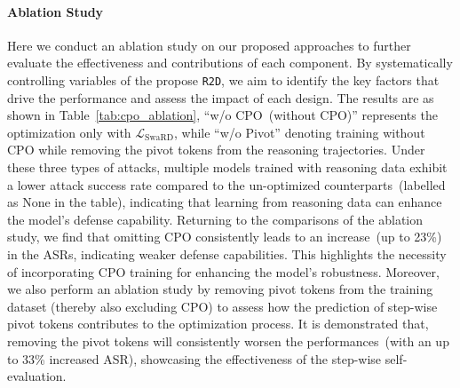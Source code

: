 \paragraph{Ablation Study} Here we conduct an ablation study on our proposed approaches to further evaluate the effectiveness and contributions of each component. By systematically controlling variables of the propose \texttt{R2D}, we aim to identify the key factors that drive the performance and assess the impact of each design. The results are as shown in Table~\ref{tab:cpo_ablation}, ``w/o CPO~(without CPO)'' represents the optimization only with $\mathcal{L}_\text{SwaRD}$, while ``w/o Pivot'' denoting training without CPO while removing the pivot tokens from the reasoning trajectories. Under these three types of attacks, multiple models trained with reasoning data exhibit a lower attack success rate compared to the un-optimized counterparts~(labelled as None in the table), indicating that learning from reasoning data can enhance the model's defense capability. Returning to the comparisons of the ablation study, we find that omitting CPO consistently leads to an increase~(up to 23\%) in the ASRs, indicating weaker defense capabilities. This highlights the necessity of incorporating CPO training for enhancing the model’s robustness. Moreover, we also perform an ablation study by removing pivot tokens from the training dataset (thereby also excluding CPO) to assess how the prediction of step-wise pivot tokens contributes to the optimization process. It is demonstrated that, removing the pivot tokens will consistently worsen the performances~(with an up to 33\% increased ASR), showcasing the effectiveness of the step-wise self-evaluation.